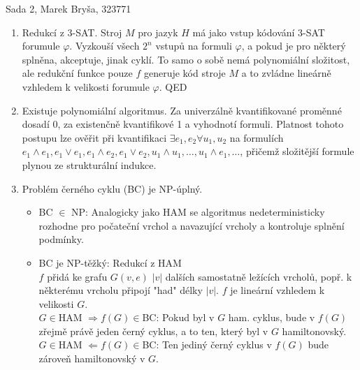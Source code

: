 \documentclass[a4wide,10pt]{extarticle}
\begin{document}
\begin{flushleft}
Sada 2, Marek Bryša, 323771
\end{flushleft}
\begin{enumerate}
  \item
		Redukcí z 3-SAT. Stroj $M$ pro jazyk $H$ má jako vstup kódování 3-SAT forumule $\varphi$. Vyzkouší všech $2^n$ vstupů na formuli $\varphi$, a pokud je pro některý splněna, akceptuje, jinak cyklí. To samo o sobě nemá polynomiální složitost, ale redukční funkce pouze $f$ generuje kód stroje $M$ a to zvládne lineárně vzhledem k velikosti forumule $\varphi$. QED
	\item
		Existuje polynomiální algoritmus. Za univerzálně kvantifikované proměnné dosadí 0, za existenčně kvantifikové 1 a vyhodnotí formuli. Platnost tohoto postupu lze ověřit při kvantifikaci $\exists e_1,e_2 \forall u_1,u_2$ na formulích $e_1 \wedge e_1, e_1 \vee e_1, e_1 \wedge e_2, e_1 \vee e_2, u_1 \wedge u_1, \dots, u_1 \wedge e_1, \dots$, přičemž složitější formule plynou ze strukturální indukce.
	\item
		Problém černého cyklu (BC) je NP-úplný.
		\begin{itemize}
			\item BC $\in$ NP: Analogicky jako HAM se algoritmus nedeterministicky rozhodne pro počateční vrchol a navazující vrcholy a kontroluje splnění podmínky.
			\item
				BC je NP-těžký: Redukcí z HAM\\
				$f$ přidá ke grafu $G(v,e)$ $|v|$ dalších samostatně ležících vrcholů, popř. k některému vrcholu připojí "had" délky $|v|$. $f$ je lineární vzhledem k velikosti $G$.\\
				$G\in$HAM $\Rightarrow f(G)\in$BC: Pokud byl v $G$ ham. cyklus, bude v $f(G)$ zřejmě právě jeden černý cyklus, a to ten, který byl v $G$ hamiltonovský.\\
				$G\in$HAM $\Leftarrow f(G)\in$BC: Ten jediný černý cyklus v $f(G)$ bude zároveň hamiltonovský v $G$.
				

\end{itemize}
\end{enumerate}
\end{document}
